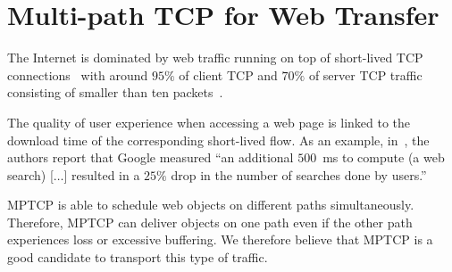 \section{Multi-path TCP for Web Transfer}
\label{sec:transports}

The Internet is dominated by web traffic running on top of short-lived TCP connections~\cite{Labovitz-IOR-2009} with
around $95\%$ of client TCP and $70\%$ of server TCP traffic consisting of smaller than ten packets~\cite{Ciullo-IEEECL-2009}.

The quality of user experience when accessing a web page is linked to the download time of the corresponding short-lived flow. As an example,
in~\cite{why-latency-matters-2013}, the authors report that Google measured ``an additional $500$~ms to compute (a web search) [$\ldots$] resulted in a
$25\%$ drop in the number of searches done by users.''

MPTCP is able to schedule web objects on different paths simultaneously. Therefore, MPTCP can deliver objects on one path even if the other path
experiences loss or excessive buffering. We therefore believe that MPTCP is a good candidate to transport this type of traffic.



